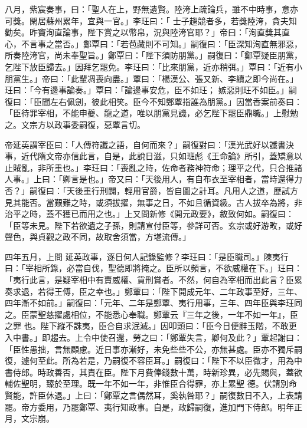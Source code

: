 \begin{pinyinscope}
 八月，紫宸奏事，曰：「聖人在上，野無遺賢。陸洿上疏論兵，雖不中時事，意亦可獎。閑居蘇州累年，宜與一官。」李玨曰：「
 士子趨競者多，若獎陸洿，貪夫知勸矣。昨竇洵直論事，陛下賞之以幣帛，況與陸洿官耶？」帝曰：「洵直獎其直心，不言事之當否。」鄭覃曰：「若苞藏則不可知。」嗣復曰：「臣深知洵直無邪惡，所奏陸洿官，尚未奉聖旨。」鄭覃曰：「陛下須防朋黨。」嗣復曰：「鄭覃疑臣朋黨，乞陛下放臣歸去。」因拜乞罷免。李玨曰：「比來朋黨，近亦稍弭。」覃曰：「近有小朋黨生。」帝曰：「此輩凋喪向盡。」覃曰：「楊漢公、張又新、李續之即今尚在。」玨曰：「今有邊事論奏。」覃曰：「論邊事安危，臣不如玨；
 嫉惡則玨不如臣。」嗣復曰：「臣聞左右佩劍，彼此相笑。臣今不知鄭覃指誰為朋黨。」因當香案前奏曰：「臣待罪宰相，不能申夔、龍之道，唯以朋黨見譏，必乞陛下罷臣鼎職。」上慰勉之。文宗方以政事委嗣復，惡覃言切。



 帝延英謂宰臣曰：「人傳符讖之語，自何而來？」嗣復對曰：「漢光武好以讖書決事，近代隋文帝亦信此言，自是，此說日滋，只如班彪《王命論》所引，蓋矯意以止賊亂，非所重也。」李玨曰：「喪亂之時，佐命者務神符命；理平之代，只合推諸
 人事。」上曰：「卿言是也。」帝又曰：「天後用人，有自布衣至宰相者，當時還得力否？」嗣復曰：「天後重行刑闢，輕用官爵，皆自圖之計耳。凡用人之道，歷試方見其能否。當艱難之時，或須拔擢，無事之日，不如且循資級。古人拔卒為將，非治平之時，蓋不獲已而用之也。」上又問新修《開元政要》，敘致何如。嗣復曰：「臣等未見。陛下若欲遺之子孫，則請宣付臣等，參詳可否。玄宗或好游畋，或好聲色，與貞觀之政不同，故取舍須當，方堪流傳。」



 四年五月，上問
 延英政事，逐日何人記錄監修？李玨曰：「是臣職司。」陳夷行曰：「宰相所錄，必當自伐，聖德即將掩之。臣所以頻言，不欲威權在下。」玨曰：「夷行此言，是疑宰相中有賣威權、貨刑賞者。不然，何自為宰相而出此言？臣累奏求退，若得王傅，臣之幸也。」鄭覃曰：「陛下開成元年、二年政事至好，三年、四年漸不如前。」嗣復曰：「元年、二年是鄭覃、夷行用事，三年、四年臣與李玨同之。臣蒙聖慈擢處相位，不能悉心奉職。鄭覃云『三年之後，一年不如一年』，臣之罪
 也。陛下縱不誅夷，臣合自求泯滅。」因叩頭曰：「臣今日便辭玉階，不敢更入中書。」即趨去。上令中使召還，勞之曰：「鄭覃失言，卿何及此？」覃起謝曰：「臣性愚拙，言無顧慮。近日事亦漸好，未免些些不公，亦無甚處。臣亦不獨斥嗣復，遽何至此。所為若是，乃嗣復不容臣耳。」嗣復曰：「陛下不以臣微才，用為中書侍郎。時政善否，其責在臣。陛下月費俸錢數十萬，時新珍異，必先賜與，蓋欲輔佐聖明，臻於至理。既一年不如一年，非惟臣合得罪，亦上累聖
 德。伏請別命賢能，許臣休退。」上曰：「鄭覃之言偶然耳，奚執咎耶？」嗣復數日不入，上表請罷。帝方委用，乃罷鄭覃、夷行知政事。自是，政歸嗣復，進加門下侍郎。明年正月，文宗崩。




\end{pinyinscope}
